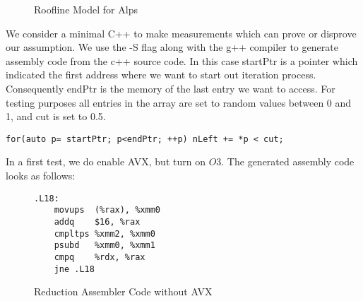\documentclass[]{article}
\begin{document}
\begin{figure}[H]
	\begin{center}
	\end{center}
	\caption{Roofline Model for Alps}
	\label{fig:modelcpu}
\end{figure}

We consider a minimal C++ to make measurements which can prove or disprove our assumption. We use the -S flag along with the g++ compiler to generate assembly code from the c++ source code. In this case startPtr is a pointer which indicated the first address where we want to start out iteration process. Consequently endPtr is the memory of the last entry we want to access. For testing purposes all entries in the array are set to random values between 0 and 1, and cut is set to 0.5. 

\begin{lstlisting}
for(auto p= startPtr; p<endPtr; ++p) nLeft += *p < cut;
\end{lstlisting}

In a first test, we do enable AVX, but turn on $O3$. The generated assembly code looks as follows:

\begin{figure}
	\begin{lstlisting}
.L18:
	movups	(%rax), %xmm0
	addq	$16, %rax
	cmpltps	%xmm2, %xmm0
	psubd	%xmm0, %xmm1
	cmpq	%rdx, %rax
	jne	.L18

	\end{lstlisting}
\caption{Reduction Assembler Code without AVX}
\label{fig:assembler}
\end{figure}
\end{document}
